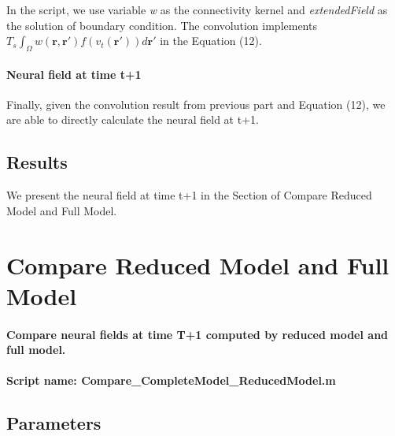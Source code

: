 \documentclass[a4paper, 12pt, english]{article}
\begin{document}
In the script, we use variable \textit{w} as the connectivity kernel and
\textit{extendedField} as the solution of boundary condition.
The convolution implements
$ T_s\int_{\Omega}w(\boldsymbol{r}, \boldsymbol{r\prime})f(v_t(\boldsymbol{r\prime}))d\boldsymbol{r\prime}$
in the Equation (12).

\paragraph{Neural field at time t+1\newline}
Finally, given the convolution result from previous part and Equation (12),
we are able to directly calculate the neural field at t+1.

\subsection{Results}
We present the neural field at time t+1 in the Section of Compare Reduced Model and Full Model.
\newpage


\section{Compare Reduced Model and Full Model}
\paragraph{Compare neural fields at time T+1 computed by reduced model and full model.}

\paragraph{Script name: Compare\_CompleteModel\_ReducedModel.m}

\subsection{Parameters}
\end{document}
